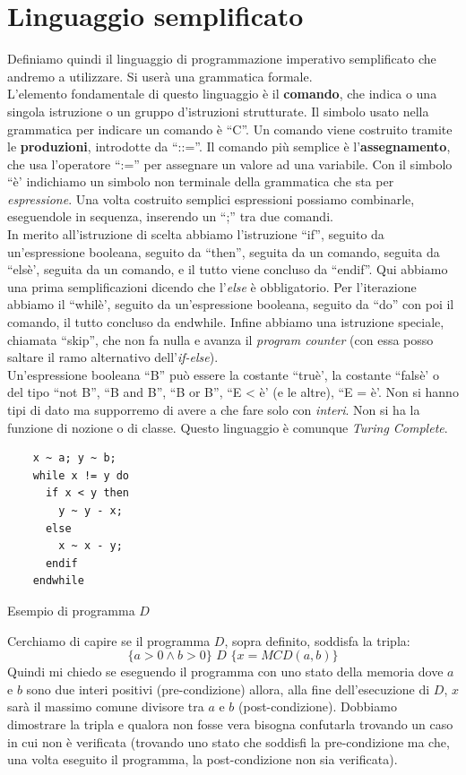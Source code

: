 \section{Linguaggio semplificato}
Definiamo quindi il linguaggio di programmazione imperativo semplificato che
andremo a utilizzare. Si userà una grammatica formale.\\
L'elemento fondamentale di questo linguaggio è il \textbf{comando}, che indica o
una singola istruzione o un gruppo d'istruzioni strutturate. Il simbolo usato
nella grammatica per indicare un comando è ``C''. Un comando viene costruito
tramite le \textbf{produzioni}, introdotte da ``::=''. Il comando più semplice è
l'\textbf{assegnamento}, che usa l'operatore ``:='' per assegnare un valore ad
una variabile. Con il simbolo ``è' indichiamo un simbolo non terminale della
grammatica che sta per \textit{espressione}. Una volta costruito semplici
espressioni possiamo combinarle, eseguendole in sequenza, inserendo un ``;'' tra
due comandi.\\ 
In merito all'istruzione di scelta abbiamo l'istruzione ``if'', seguito da
un'espressione booleana, seguito da ``then'', seguita da un comando, seguita da
``elsè', seguita da un comando, e il tutto viene concluso da ``endif''. Qui
abbiamo una prima semplificazioni dicendo che l'\textit{else} è
obbligatorio. Per l'iterazione abbiamo il ``whilè', seguito da un'espressione
booleana, seguito da ``do'' con poi il comando, il tutto concluso da
endwhile. Infine abbiamo una istruzione speciale, chiamata ``skip'', che non fa
nulla e avanza il \textit{program counter} (con essa posso saltare il ramo
alternativo dell'\textit{if-else}).\\
Un'espressione booleana ``B'' può essere la costante ``truè', la costante
``falsè' o del tipo ``not B'', ``B and B'', ``B or B'', ``E < è' (e le altre),
``E = è'. Non si hanno tipi di dato ma supporremo di avere a che fare solo con
\textit{interi}. Non si ha la funzione di nozione o di classe. Questo linguaggio
è comunque \textit{Turing Complete}.
\begin{listing}[H]
	\begin{lstlisting}
    x ~ a; y ~ b;
    while x != y do
      if x < y then
        y ~ y - x;
      else
        x ~ x - y;
      endif
    endwhile  
	\end{lstlisting}
	\caption{Esempio di programma $D$}
	\label{listing:D}
\end{listing}
Cerchiamo di capire se il programma $D$, sopra definito, soddisfa la tripla:
\[\{a>0\land b>0\}\,\, D\,\, \{x=MCD(a, b)\}\]
Quindi mi chiedo se eseguendo il programma con uno stato della memoria dove $a$
e $b$ sono due interi positivi (pre-condizione) allora, alla fine dell'esecuzione
di $D$, $x$ sarà il massimo comune divisore tra $a$ e $b$
(post-condizione). Dobbiamo dimostrare la tripla e qualora non fosse vera bisogna
confutarla trovando un caso in cui non è verificata (trovando uno stato che
soddisfi la pre-condizione ma che, una volta eseguito il programma, la post-condizione non 
sia verificata).
